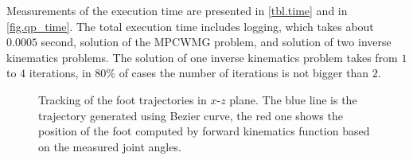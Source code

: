 Measurements of the execution time are presented in \cref{tbl.time} and in 
\cref{fig.qp_time}. The total execution time includes logging, which takes about 
$0.0005$ second, solution of the \ac{MPCWMG} problem, and solution of two inverse 
kinematics problems. The solution of one inverse kinematics problem takes from 
$1$ to $4$ iterations, in $80$\% of cases the number of iterations is not bigger 
than $2$.

\begin{figure}[!ht]
    \centering
\caption[Foot trajectory tracking]{Tracking of the foot trajectories in $x\mbox{-}z$
plane. The blue line is the trajectory generated using Bezier curve, the red one 
shows the position of the foot computed by forward kinematics function based on the 
measured joint angles.}
\label{fig.robot_foottraj}
\end{figure}

